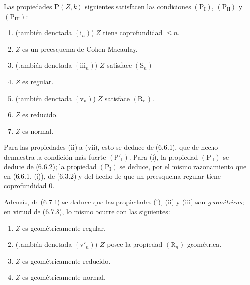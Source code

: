 \begin{examples}[7.3.8]
\label{IV.2.s7.3.8-fr}
Las propiedades $\boldsymbol P(Z,k)$ siguientes
satisfacen las condiciones $(\mathrm P_{\mathrm I})$,
$(\mathrm P_{\mathrm{II}})$ y $(\mathrm P_{\mathrm{III}})$:
\begin{enumerate}
\item[(i)] (también denotada $(\mathrm i_n)$) $Z$ tiene coprofundidad
$\leqslant n$.
\item[(ii)] $Z$ es un preesquema de Cohen-Macaulay.
\item[(iii)] (también denotada $(\mathrm{iii}_n)$) $Z$ satisface
$(\mathrm S_n)$.
\item[(iv)] $Z$ es regular.
\item[(v)] (también denotada $(\mathrm v_n)$) $Z$ satisface
$(\mathrm R_n)$.
\item[(vi)] $Z$ es reducido.
\item[(vii)] $Z$ es normal.
\end{enumerate}

Para las propiedades (ii) a (vii), esto se deduce de (6.6.1), que de
hecho demuestra la condición más fuerte $(\mathrm P'_{\mathrm I})$.
Para (i), la propiedad $(\mathrm P_{\mathrm{II}})$ se deduce de
(6.6.2); la propiedad $(\mathrm P_{\mathrm I})$ se deduce, por el
mismo razonamiento que en (6.6.1, (i)), de (6.3.2) y del hecho de que
un preesquema regular tiene coprofundidad 0.

Además, de (6.7.1) se deduce que las propiedades (i), (ii) y (iii) son
\emph{geométricas}; en virtud de (6.7.8), lo mismo ocurre con las siguientes:
\begin{enumerate}
\item[(iv$'$)] $Z$ es geométricamente regular.
\item[(v$'$)] (también denotada $(\mathrm v'_n)$) $Z$ posee la
propiedad $(\mathrm R_n)$ geométrica.
\item[(vi$'$)] $Z$ es geométricamente reducido.
\item[(vii$'$)] $Z$ es geométricamente normal.
\end{enumerate}
\end{examples}
